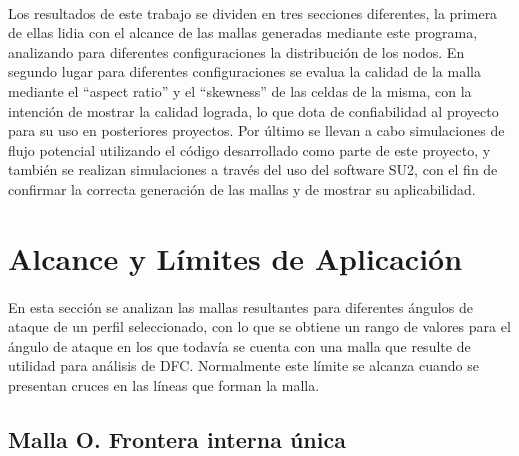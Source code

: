 \documentclass[letterpaper, openright, 12pt]{book}
\begin{document}
    \paragraph*{}
    Los resultados de este trabajo se dividen en tres secciones diferentes,
    la primera de ellas lidia con el alcance de las mallas generadas
    mediante este programa, analizando para diferentes configuraciones la
    distribución de los nodos. En segundo lugar para diferentes
    configuraciones se evalua la calidad de la malla mediante el
    ``aspect ratio'' y el ``skewness'' de las celdas de la misma, con la
    intención de mostrar la calidad lograda, lo que dota de
    confiabilidad al proyecto para su uso en posteriores proyectos.
    Por último se llevan a cabo simulaciones de flujo potencial utilizando
    el código desarrollado como parte de este proyecto, y también se
    realizan simulaciones a través del uso del software SU2, con el fin de
    confirmar la correcta generación de las mallas y de mostrar su
    aplicabilidad.

    \section{Alcance y Límites de Aplicación}
    \paragraph*{}
    En esta sección se analizan las mallas resultantes para diferentes
    ángulos de ataque de un perfil seleccionado, con lo que se obtiene un
    rango de valores para el ángulo de ataque en los que todavía se cuenta
    con una malla que resulte de utilidad para análisis de DFC\@. Normalmente
    este límite se alcanza cuando se presentan cruces en las líneas que
    forman la malla.

    \subsection{Malla O. Frontera interna única}
\end{document}

